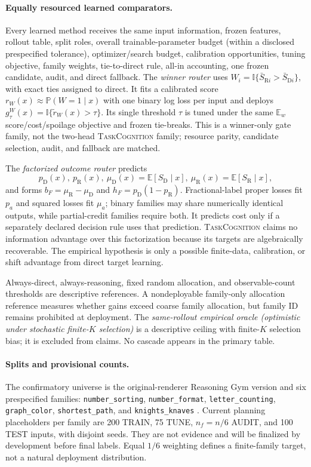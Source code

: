 \documentclass{article}
\newcommand{\TC}{\textsc{TaskCognition}}
\newcommand{\D}{\ensuremath{\mathrm{D}}}
\newcommand{\Rpol}{\ensuremath{\mathrm{R}}}
\newcommand{\1}{\mathbb{I}}
\newcommand{\E}{\mathbb{E}}
\newcommand{\Ew}{\mathbb{E}_{w}}
\newcommand{\Prb}{\mathbb{P}}
\begin{document}
\paragraph{Equally resourced learned comparators.}
Every learned method receives the same input information, frozen features, rollout table, split roles, overall trainable-parameter budget (within a disclosed prespecified tolerance), optimizer/search budget, calibration opportunities, tuning objective, family weights, tie-to-direct rule, all-in accounting, one frozen candidate, audit, and direct fallback. The \emph{winner router} uses $W_i=\1\{\bar S_{\Rpol i}>\bar S_{\D i}\}$, with exact ties assigned to direct. It fits a calibrated score $r_W(x)\approx\Prb(W=1\mid x)$ with one binary log loss per input and deploys $g^W_\tau(x)=\1\{\widetilde r_W(x)>\tau\}$. Its single threshold $\tau$ is tuned under the same $\Ew$ score/cost/spoilage objective and frozen tie-breaks. This is a winner-only gate family, not the two-head \TC{} family; resource parity, candidate selection, audit, and fallback are matched.

The \emph{factorized outcome router} predicts
\begin{equation}
 p_\D(x),\ p_\Rpol(x),\ \mu_\D(x)=\E[S_\D\mid x],\ \mu_\Rpol(x)=\E[S_\Rpol\mid x],
 \label{eq:factorized}
\end{equation}
and forms $b_F=\mu_\Rpol-\mu_\D$ and $h_F=p_\D(1-p_\Rpol)$. Fractional-label proper losses fit $p_a$ and squared losses fit $\mu_a$; binary families may share numerically identical outputs, while partial-credit families require both. It predicts cost only if a separately declared decision rule uses that prediction. \TC{} claims no information advantage over this factorization because its targets are algebraically recoverable. The empirical hypothesis is only a possible finite-data, calibration, or shift advantage from direct target learning.

Always-direct, always-reasoning, fixed random allocation, and observable-count thresholds are descriptive references. A nondeployable family-only allocation reference measures whether gains exceed coarse family allocation, but family ID remains prohibited at deployment. The \emph{same-rollout empirical oracle (optimistic under stochastic finite-$K$ selection)} is a descriptive ceiling with finite-$K$ selection bias; it is excluded from claims. No cascade appears in the primary table.

\paragraph{Splits and provisional counts.}
The confirmatory universe is the original-renderer Reasoning Gym version and six prespecified families: \texttt{number\_sorting}, \texttt{number\_format}, \texttt{letter\_counting}, \texttt{graph\_color}, \texttt{shortest\_path}, and \texttt{knights\_knaves} \citep{stojanovski2025reasoninggym,reasoninggymsoftware2026}. Current planning placeholders per family are 200 TRAIN, 75 TUNE, $n_f=n/6$ AUDIT, and 100 TEST inputs, with disjoint seeds. They are not evidence and will be finalized by development before final labels. Equal $1/6$ weighting defines a finite-family target, not a natural deployment distribution.
\end{document}
